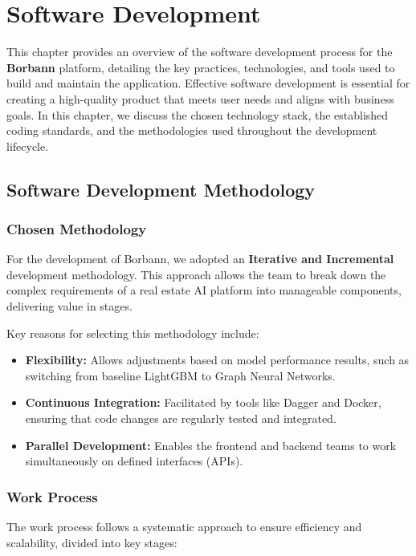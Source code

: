 \chapter{Software Development}

This chapter provides an overview of the software development process for the \textbf{Borbann} platform, detailing the key practices, technologies, and tools used to build and maintain the application. Effective software development is essential for creating a high-quality product that meets user needs and aligns with business goals. In this chapter, we discuss the chosen technology stack, the established coding standards, and the methodologies used throughout the development lifecycle.

\section{Software Development Methodology}

\subsection{Chosen Methodology}
For the development of Borbann, we adopted an \textbf{Iterative and Incremental} development methodology. This approach allows the team to break down the complex requirements of a real estate AI platform into manageable components, delivering value in stages.

Key reasons for selecting this methodology include:
\begin{itemize}
    \item \textbf{Flexibility:} Allows adjustments based on model performance results, such as switching from baseline LightGBM to Graph Neural Networks.
    \item \textbf{Continuous Integration:} Facilitated by tools like Dagger and Docker, ensuring that code changes are regularly tested and integrated.
    \item \textbf{Parallel Development:} Enables the frontend and backend teams to work simultaneously on defined interfaces (APIs).
\end{itemize}

\subsection{Work Process}
The work process follows a systematic approach to ensure efficiency and scalability, divided into key stages:


